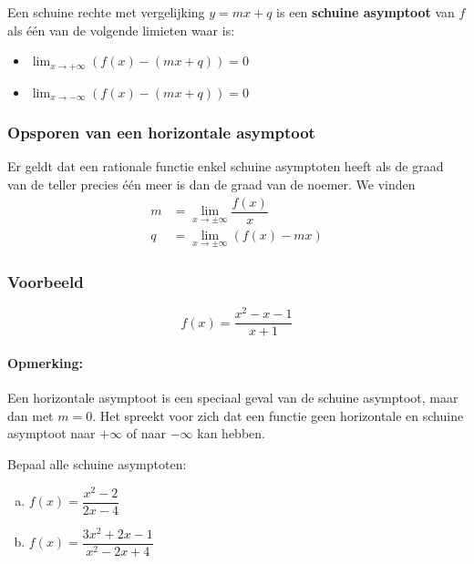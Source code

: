 \documentclass[12pt]{article}
\newenvironment{definitie}
{
  \vspace{0.4cm}
  \begin{mdframed}[nobreak=true,frametitle={Definitie}]
  }{%
  \end{mdframed}
}
\begin{document}
\begin{theorie}
\begin{definitie}
Een schuine rechte met vergelijking $y=mx+q$ is een {\bf schuine asymptoot} van $f$ als één van de volgende limieten waar is:
\begin{multicols}{2}
\begin{itemize}
  \item $\lim_{x\to+\infty} \left(f(x)-(mx+q)\right)=0$
  \item $\lim_{x\to-\infty} \left(f(x)-(mx+q)\right)=0$
\end{itemize}
\end{multicols}
\end{definitie}

\subsubsection*{Opsporen van een horizontale asymptoot}

Er geldt dat een rationale functie enkel schuine asymptoten heeft als de graad van de teller precies één meer is dan de graad van de noemer. We vinden
\begin{align*}
  m&=\lim_{x\to\pm\infty}\dfrac{f(x)}{x}\\
  q&=\lim_{x\to\pm\infty}\left(f(x)-mx\right)
\end{align*}

\subsubsection*{Voorbeeld}
$$f(x)=\dfrac{x^2-x-1}{x+1}$$

\paragraph*{Opmerking:} Een horizontale asymptoot is een speciaal geval van de schuine asymptoot, maar dan met $m=0$. Het spreekt voor zich dat een functie geen horizontale en schuine asymptoot naar $+\infty$ of naar $-\infty$ kan hebben.

\end{theorie}

\begin{oefening}
Bepaal alle schuine asymptoten:
\begin{enumerate}[(a)]
  \itemsep.5em
  \item $f(x)=\dfrac{x^2-2}{2x-4}$
  \item $f(x)=\dfrac{3x^2+2x-1}{x^2-2x+4}$
\end{enumerate}
\end{oefening}
\end{document}
